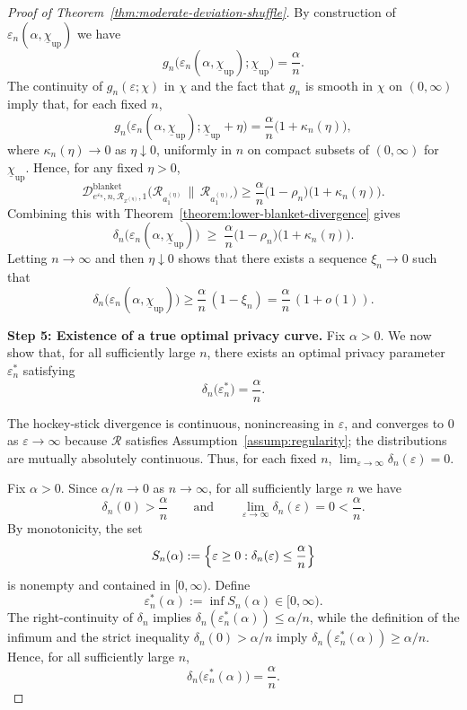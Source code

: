 \documentclass{article}
\theoremstyle{plain}
\theoremstyle{definition}
\begin{document}
\begin{proof}[Proof of Theorem~\ref{thm:moderate-deviation-shuffle}]
By construction of $\varepsilon_n(\alpha,\underline\chi_{\mathrm{up}})$ we
have
\[
  g_n\bigl(\varepsilon_n(\alpha,\underline\chi_{\mathrm{up}});
           \underline\chi_{\mathrm{up}}\bigr)
  =
  \frac{\alpha}{n}.
\]
The continuity of $g_n(\varepsilon;\chi)$ in $\chi$ and the fact that
$g_n$ is smooth in $\chi$ on $(0,\infty)$ imply that, for each fixed $n$,
\[
  g_n\bigl(\varepsilon_n(\alpha,\underline\chi_{\mathrm{up}});
           \underline\chi_{\mathrm{up}}+\eta\bigr)
  =
  \frac{\alpha}{n}\bigl(1+\kappa_n(\eta)\bigr),
\]
where $\kappa_n(\eta)\to0$ as $\eta\downarrow0$, uniformly in $n$ on
compact subsets of $(0,\infty)$ for $\underline\chi_{\mathrm{up}}$. Hence,
for any fixed $\eta>0$,
\[
  \mathcal D^{\mathrm{blanket}}_{e^{\varepsilon_n},n,\mathcal R_{x^{(\eta)}},1}
    \bigl(
      \mathcal R_{a_1^{(\eta)}}
      \,\big\|\,
      \mathcal R_{a_1^{(\eta)}{}'}
    \bigr)
  \ge
  \frac{\alpha}{n}
  \bigl(1-\rho_n\bigr)\bigl(1+\kappa_n(\eta)\bigr).
\]
Combining this with Theorem~\ref{theorem:lower-blanket-divergence} gives
\[
  \delta_n\bigl(\varepsilon_n(\alpha,\underline\chi_{\mathrm{up}})\bigr)
  \;\ge\;
  \frac{\alpha}{n}
  \bigl(1-\rho_n\bigr)\bigl(1+\kappa_n(\eta)\bigr).
\]
Letting $n\to\infty$ and then $\eta\downarrow0$ shows that there exists a
sequence $\xi_n\to0$ such that
\[
  \delta_n\bigl(\varepsilon_n(\alpha,\underline\chi_{\mathrm{up}})\bigr)
  \ge
  \frac{\alpha}{n}\,(1-\xi_n)
  =
  \frac{\alpha}{n}\,(1+o(1)).
\]


\medskip\noindent
\textbf{Step 5: Existence of a true optimal privacy curve.}
Fix $\alpha>0$. We now show that, for all sufficiently large $n$, there
exists an optimal privacy parameter $\varepsilon_n^{\ast}$
satisfying
\[
  \delta_n\bigl(\varepsilon_n^{\ast}\bigr)
  = \frac{\alpha}{n}.
\]


The hockey-stick divergence is continuous, nonincreasing in $\varepsilon$, and converges to $0$ as $\varepsilon\to\infty$ because $\mathcal{R}$ satisfies Assumption~\ref{assump:regularity}; the distributions are mutually absolutely continuous.
Thus, for each fixed $n$,
$
  \lim_{\varepsilon\to\infty}\delta_n(\varepsilon) = 0.
$

Fix $\alpha>0$. Since $\alpha/n\to0$ as $n\to\infty$, for all
sufficiently large $n$ we have
\[
  \delta_n(0) > \frac{\alpha}{n}
  \qquad\text{and}\qquad
  \lim_{\varepsilon\to\infty}\delta_n(\varepsilon)=0
  < \frac{\alpha}{n}.
\]
By monotonicity, the set
\[
  S_n(\alpha)
  :=
  \Bigl\{\varepsilon\ge0:
     \delta_n(\varepsilon)\le\frac{\alpha}{n}
  \Bigr\}
\]
is nonempty and contained in $[0,\infty)$. Define
\[
  \varepsilon_n^{\ast}(\alpha)
  :=
  \inf S_n(\alpha)\in[0,\infty).
\]
The right-continuity of $\delta_n$ implies
$\delta_n(\varepsilon_n^{\ast}(\alpha))\le\alpha/n$, while the
definition of the infimum and the strict inequality
$\delta_n(0)>\alpha/n$ imply
$\delta_n(\varepsilon_n^{\ast}(\alpha))\ge\alpha/n$. Hence, for
all sufficiently large $n$,
\[
  \delta_n\bigl(\varepsilon_n^{\ast}(\alpha)\bigr)
  = \frac{\alpha}{n}.
\]


\end{proof}
\end{document}
